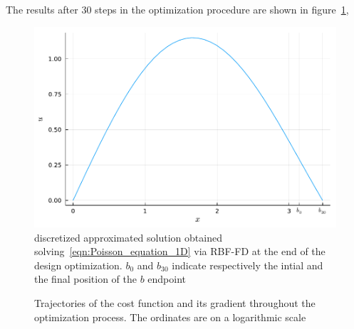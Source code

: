 \smallskip
The results after $30$ steps in the optimization procedure are shown in figure~\ref{fig:opt_results_1D},

\begin{figure}
	\centering
	\includegraphics[width=.75\textwidth]{img/uOpt_vs_x_1D.pdf}
	\caption{discretized approximated solution obtained solving~\eqref{eqn:Poisson_equation_1D} via RBF-FD at the end of the design optimization. $b_0$ and $b_{30}$ indicate respectively the intial and the final position of the $b$ endpoint}
	\label{fig:opt_results_1D}
\end{figure}

\begin{figure}
	\centering
	 \quad
	\caption{Trajectories of the cost function and its gradient throughout the optimization process. The ordinates are on a logarithmic scale}
	\label{fig:opt_history_1D}
\end{figure}

